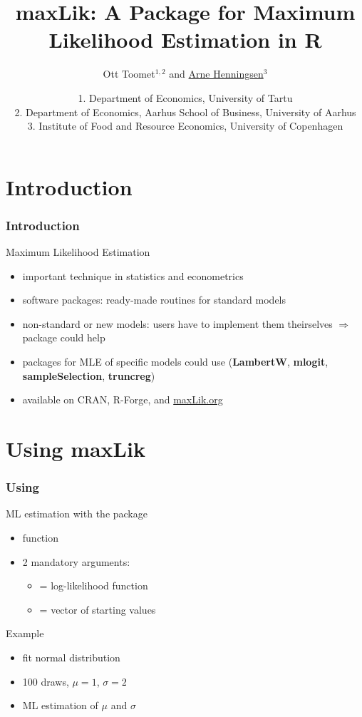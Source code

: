 \documentclass{beamer}
\title[maxLik: Maximum Likelihood in \R]{
   maxLik: A Package for Maximum Likelihood Estimation in \textsf{R}}
\author[Arne Henningsen]{Ott Toomet$^{1,2}$ and \underline{Arne Henningsen}$^3$}
\date{\footnotesize{
1. Department of Economics, University of Tartu\\
2. Department of Economics, Aarhus School of Business, University of Aarhus\\
3. Institute of Food and Resource Economics, University of Copenhagen}}
\begin{document}
\begin{frame}[plain]
\setlength{\textwidth}{1.15\textwidth}
\titlepage
\end{frame}

\section{Introduction}
\begin{frame}
\frametitle{Introduction}
Maximum Likelihood Estimation
\begin{itemize}
\item important technique in statistics and econometrics
\item software packages: ready-made routines for standard models
\item non-standard or new models: users have to implement them theirselves
   $\Rightarrow$  package could help
\item packages for MLE of specific models could use 
   (\textbf{LambertW}, \textbf{mlogit}, \textbf{sampleSelection},
   \textbf{truncreg})
\item {} available on CRAN, R-Forge, and \url{maxLik.org}
\end{itemize}
\end{frame}

\section{Using maxLik}
\begin{frame}
\frametitle{Using }
ML estimation with the  package
\begin{itemize}
\item function 
\item 2 mandatory arguments:
   \begin{itemize}
   \item {} = log-likelihood function
   \item {} = vector of starting values
   \end{itemize}
\end{itemize}
\vspace*{2ex}
Example
\begin{itemize}
\item fit normal distribution
\item 100 draws, $\mu = 1$, $\sigma = 2$\\
\item ML estimation of $\mu$ and $\sigma$
\end{itemize}
\end{frame}
\end{document}
